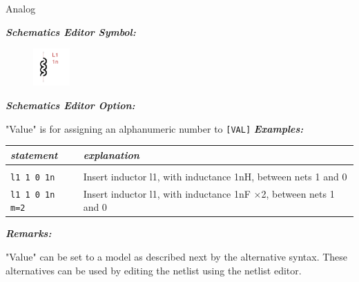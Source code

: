 Analog

\textbf{\textit{Schematics Editor Symbol:}}

\begin{figure}[htb]
  \begin{center}
    \includegraphics[width=0.125\textwidth]{./pics/SpiceEl/Inductor.png}
  \end{center}
\end{figure}

\textbf{\textit{Schematics Editor Option:}}

"\textsf{Value}" is for assigning an alphanumeric number to \texttt{[VAL]}
\newpage
\textbf{\textit{Examples:}}

\begin{longtable}{l l}
\textit{statement} & \textit{explanation} \\ \hline \\ \vspace{-0.8\parskip} 
\texttt{l1 1 0 1n} & {\small Insert inductor l1, with inductance 1nH, between nets 1 and 0} \\
\texttt{l1 1 0 1n m=2} & {\small Insert inductor l1, with inductance 1nF $\times$2, between nets 1 and 0}
\end{longtable}

\textbf{\textit{Remarks:}}

"\textsf{Value}" can be set to a model as described next by the alternative syntax. These alternatives can be used by editing the netlist using the netlist editor.





